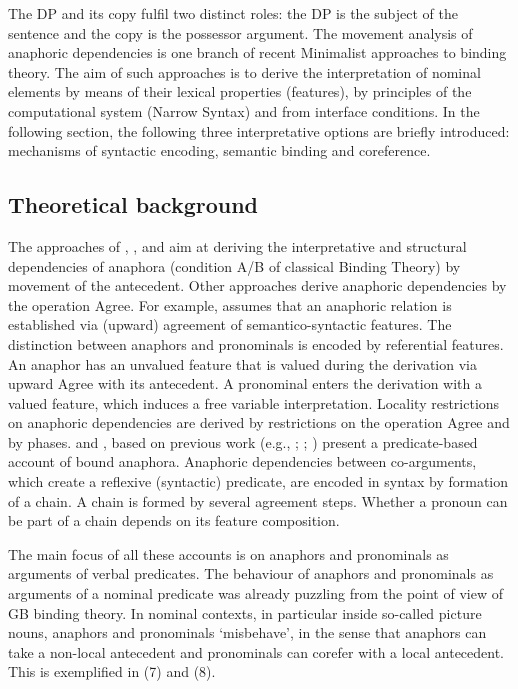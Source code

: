 \documentclass[output=paper]{langsci/langscibook}
\begin{document}
The DP and its copy fulfil two distinct roles: the DP is the subject of the sentence and the copy is the possessor argument. The movement analysis of anaphoric dependencies is one branch of recent Minimalist approaches to binding theory. The aim of such approaches is to derive the interpretation of nominal elements by means of their lexical properties (features), by principles of the computational system (Narrow Syntax) and from interface conditions. In the following section, the following three interpretative options are briefly introduced: mechanisms of syntactic encoding, semantic binding and coreference.

\subsection{Theoretical background}%

The approaches of \citet{Hornstein2001,Hornstein2007}, \citet{Boeckx2010}, \citet{Zwart2002} and \citet{Kayne2002} aim at deriving the interpretative and structural dependencies of anaphora (condition A/B of classical Binding Theory) by movement of the antecedent. Other approaches derive anaphoric dependencies by the operation Agree. For example, \citet{Hicks2009} assumes that an anaphoric relation is established via (upward) agreement of semantico-syntactic features. The distinction between anaphors and pronominals is encoded by referential features. An anaphor has an unvalued feature that is valued during the derivation via upward Agree with its antecedent. A pronominal enters the derivation with a valued feature, which induces a free variable interpretation. Locality restrictions on anaphoric dependencies are derived by restrictions on the operation Agree and by phases. \citet{Reinhart2006} and \citet{Reuland2011}, based on previous work (e.g., \citealt{Reinhart1983}; \citealt{Reinhart1993,Reinhart1995}; \citealt{Reuland2001}) present a predicate-based account of bound anaphora. Anaphoric dependencies between co-arguments, which create a reflexive (syntactic) predicate, are encoded in syntax by formation of a chain. A chain is formed by several agreement steps. Whether a pronoun can be part of a chain depends on its feature composition.

The main focus of all these accounts is on anaphors and pronominals as arguments of verbal predicates. The behaviour of anaphors and pronominals as arguments of a nominal predicate was already puzzling from the point of view of GB binding theory. In nominal contexts, in particular inside so-called picture nouns, anaphors and pronominals ‘misbehave’, in the sense that anaphors can take a non-local antecedent and pronominals can corefer with a local antecedent. This is exemplified in (7) and (8). 
\end{document}
